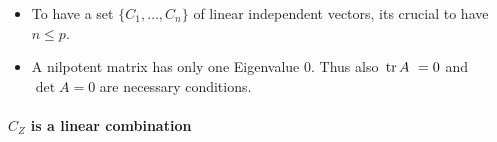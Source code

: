 	\begin{remark}
	\begin{itemize}
	\item To have a set $\{C_1,\ldots,C_n\}$ of linear independent vectors, its crucial 
	to have $n\leq p$.
	\item A nilpotent matrix has only one Eigenvalue $0$. Thus also $\, \text{tr}\,A \,\, = 0$ and 
	$\det{A}=0$ are necessary conditions.
	\end{itemize}
	\end{remark}
	
\paragraph{$C_Z$ is a linear combination}